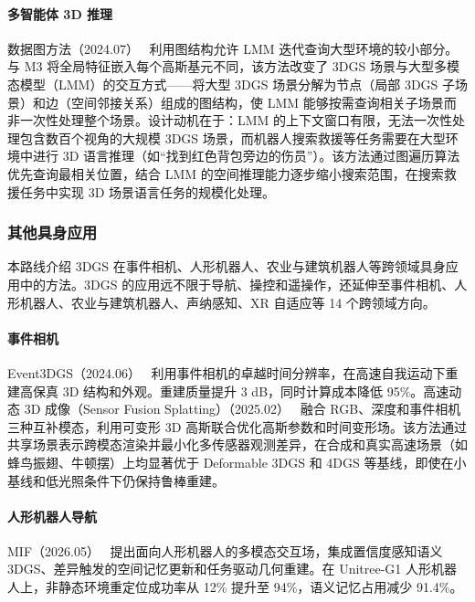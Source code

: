 \paragraph{多智能体 3D 推理}

数据图方法（2024.07）~\cite{2407_10743} 利用图结构允许 LMM 迭代查询大型环境的较小部分。与 M3 将全局特征嵌入每个高斯基元不同，该方法改变了 3DGS 场景与大型多模态模型（LMM）的交互方式——将大型 3DGS 场景分解为节点（局部 3DGS 子场景）和边（空间邻接关系）组成的图结构，使 LMM 能够按需查询相关子场景而非一次性处理整个场景。设计动机在于：LMM 的上下文窗口有限，无法一次性处理包含数百个视角的大规模 3DGS 场景，而机器人搜索救援等任务需要在大型环境中进行 3D 语言推理（如``找到红色背包旁边的伤员''）。该方法通过图遍历算法优先查询最相关位置，结合 LMM 的空间推理能力逐步缩小搜索范围，在搜索救援任务中实现 3D 场景语言任务的规模化处理。

\subsubsection{其他具身应用}

本路线介绍 3DGS 在事件相机、人形机器人、农业与建筑机器人等跨领域具身应用中的方法。3DGS 的应用远不限于导航、操控和遥操作，还延伸至事件相机、人形机器人、农业与建筑机器人、声纳感知、XR 自适应等 14 个跨领域方向。

\paragraph{事件相机}

Event3DGS（2024.06）~\cite{2406_02972} 利用事件相机的卓越时间分辨率，在高速自我运动下重建高保真 3D 结构和外观。重建质量提升 3 dB，同时计算成本降低 95\%。高速动态 3D 成像（Sensor Fusion Splatting）（2025.02）~\cite{2502_04630} 融合 RGB、深度和事件相机三种互补模态，利用可变形 3D 高斯联合优化高斯参数和时间变形场。该方法通过共享场景表示跨模态渲染并最小化多传感器观测差异，在合成和真实高速场景（如蜂鸟振翅、牛顿摆）上均显著优于 Deformable 3DGS 和 4DGS 等基线，即使在小基线和低光照条件下仍保持鲁棒重建。

\paragraph{人形机器人导航}

MIF（2026.05）~\cite{2605_21935} 提出面向人形机器人的多模态交互场，集成置信度感知语义 3DGS、差异触发的空间记忆更新和任务驱动几何重建。在 Unitree-G1 人形机器人上，非静态环境重定位成功率从 12\% 提升至 94\%，语义记忆占用减少 91.4\%。


